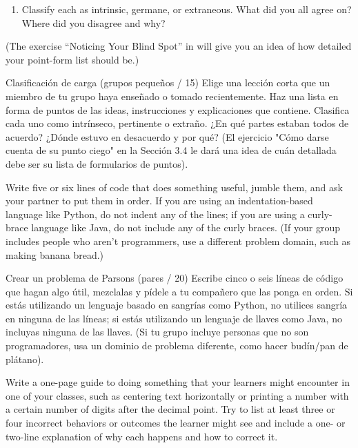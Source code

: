 {\begin{enumerate}
\item
  Classify each as intrinsic, germane, or extraneous.
  What did you all agree on?
  Where did you disagree and why?

\end{enumerate}

(The exercise ``Noticing Your Blind Spot'' in 
will give you an idea of how detailed your point-form list should be.)

Clasificación de carga (grupos pequeños / 15)
Elige una lección corta que un miembro de tu grupo haya enseñado o tomado recientemente.
Haz una lista en forma de puntos de las ideas, instrucciones y explicaciones que contiene.
Clasifica cada uno como intrínseco, pertinente o extraño. ¿En qué partes estaban todos de acuerdo? ¿Dónde estuvo en desacuerdo y por qué?
(El ejercicio "Cómo darse cuenta de su punto ciego" en la Sección  3.4 le dará una idea de cuán detallada debe ser su lista de formularios de puntos).



Write five or six lines of code that does something useful,
jumble them,
and ask your partner to put them in order.
If you are using an indentation-based language like Python,
do not indent any of the lines;
if you are using a curly-brace language like Java,
do not include any of the curly braces.
(If your group includes people who aren't programmers,
use a different problem domain,
such as making banana bread.)

Crear un problema de Parsons (pares / 20)
Escribe cinco o seis líneas de código que hagan algo útil, mezclalas y pídele a tu compañero que las ponga en orden. Si estás utilizando un lenguaje basado en sangrías como Python, no utilices sangría en ninguna de las líneas; si estás utilizando un lenguaje de llaves como Java, no incluyas ninguna de las llaves. (Si tu grupo incluye personas que no son programadores, usa un dominio de problema diferente, como hacer budín/pan de plátano).



Write a one-page guide to doing something that your learners might encounter in one of your classes,
such as centering text horizontally
or printing a number with a certain number of digits after the decimal point.
Try to list at least three or four incorrect behaviors or outcomes the learner might see
and include a one- or two-line explanation
of why each happens and how to correct it.

}
